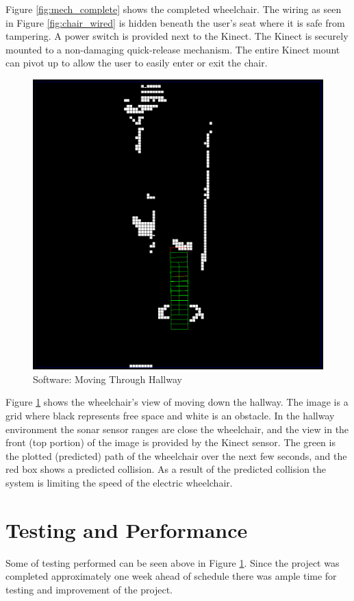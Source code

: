 \documentclass[oneside,final,a4paper]{report}
\begin{document}
Figure \ref{fig:mech_complete} shows the completed wheelchair. The wiring as seen in Figure \ref{fig:chair_wired} is hidden beneath the user's seat where it is safe from tampering. A power switch is provided next to the Kinect. The Kinect is securely mounted to a non-damaging quick-release mechanism. The entire Kinect mount can pivot up to allow the user to easily enter or exit the chair.

\begin{figure}[hbt]
 \centering
 \includegraphics[scale=0.2]{avoid_hallway}
 \caption{Software: Moving Through Hallway}
 \label{fig:soft_moving}
\end{figure}

Figure \ref{fig:soft_moving} shows the wheelchair's view of moving down the hallway. The image is a grid where black represents free space and white is an obstacle. In the hallway environment the sonar sensor ranges are close the wheelchair, and the view in the front (top portion) of the image is provided by the Kinect sensor. The green is the plotted (predicted) path of the wheelchair over the next few seconds, and the red box shows a predicted collision. As a result of the predicted collision the system is limiting the speed of the electric wheelchair.


\section{Testing and Performance}
Some of testing performed can be seen above in Figure \ref{fig:soft_moving}. Since the project was completed approximately one week ahead of schedule there was ample time for testing and improvement of the project.
\end{document}
